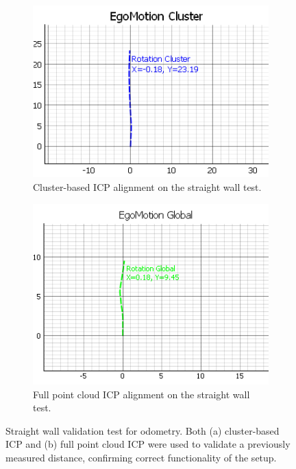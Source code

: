 \begin{figure}[!htbp]
    \centering
    \begin{subfigure}{0.48\linewidth}
        \centering
        \includegraphics[width=\linewidth]{images/straightWallCluster_ICP.png}
        \caption{Cluster-based ICP alignment on the straight wall test.}
        \label{fig:straightWall_Clustered}
    \end{subfigure}
    \hfill
    \begin{subfigure}{0.48\linewidth}
        \centering
        \includegraphics[width=\linewidth]{images/straightWallFull_ICP.png}
        \caption{Full point cloud ICP alignment on the straight wall test.}
        \label{fig:straightWall_FullICP}
    \end{subfigure}
    \caption{Straight wall validation test for odometry.  
    Both (a) cluster-based ICP and (b) full point cloud ICP were used to validate a previously measured distance, confirming correct functionality of the setup.}
    \label{fig:straightWall_Test}
\end{figure}



